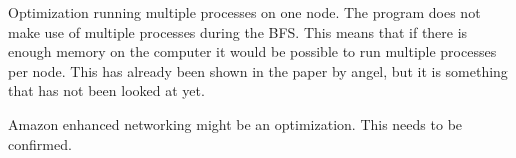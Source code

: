Optimization running multiple processes on one node. The program does not make use of multiple processes during the BFS. This means that if there is enough memory on the computer it would be possible to run multiple processes per node. This has already been shown in the paper by angel, but it is something that has not been looked at yet.

Amazon enhanced networking might be an optimization. This needs to be confirmed.